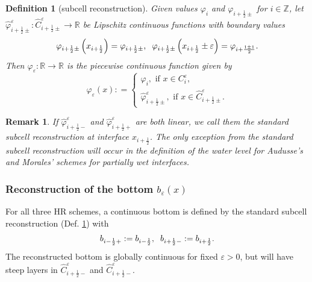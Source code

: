 \documentclass[11pt,a4paper,center,notitlepage]{article}
\numberwithin{equation}{section}
\newtheorem{definition}{Definition}
\newtheorem{remark}{Remark}
\begin{document}
\begin{definition}[subcell reconstruction] 
\label{def1}
Given values $\varphi _i$ and $\varphi _{i+\frac{1}{2}\pm}$ for $i\in \mathbb{Z}$, let $\widehat \varphi _{i + \frac{1}{2} \pm }^\varepsilon :\widehat C_{i + \frac{1}{2} \pm }^\varepsilon  \to \mathbb{R}$ be Lipschitz continuous functions with boundary values
\begin{align}
{\varphi _{i + \frac{1}{2} \pm }}\left( {{x_{i + \frac{1}{2}}}} \right) = {\varphi _{i + \frac{1}{2} \pm }}, \hspace{2mm} {\varphi _{i + \frac{1}{2} \pm }}\left( {{x_{i + \frac{1}{2}}} \pm \varepsilon } \right) = {\varphi _{i + \frac{{1 \pm 1}}{2}}}.
\end{align}
Then $\varphi _\varepsilon: \mathbb{R}\to \mathbb{R}$ is the piecewise continuous function given by 
\begin{equation*}
{\varphi _\varepsilon }\left( x \right): = \left\{ \begin{split}
{\varphi _i}, \mbox{ if } x \in C_i^\varepsilon ,\\
\widehat \varphi _{i + \frac{1}{2} \pm }^\varepsilon , \mbox{ if } x \in \widehat C_{i + \frac{1}{2} \pm }^\varepsilon .
\end{split} \right.
\end{equation*}
\end{definition}

\begin{remark}
If $\widehat \varphi _{i + \frac{1}{2} - }^\varepsilon$ and $\widehat \varphi _{i + \frac{1}{2} + }^\varepsilon$ are both linear, we call them the \emph{standard subcell reconstruction at interface} $x_{i+\frac{1}{2}}$. The only exception from the standard subcell reconstruction will occur in the definition of the water level for Audusse's and Morales' schemes for partially wet interfaces.
\end{remark}

\subsubsection{Reconstruction of the bottom $b_\varepsilon \left(x\right)$}
For all three HR schemes, a continuous bottom is defined by the standard subcell reconstruction (Def. \ref{def1}) with 
\begin{align}
{b_{i - \frac{1}{2} + }}: = {b_{i - \frac{1}{2}}}, \hspace{2mm} {b_{i + \frac{1}{2} - }}: = {b_{i + \frac{1}{2}}} .
\end{align}
The reconstructed bottom is globally continuous for fixed $\varepsilon >0$, but will have steep layers in $\widehat C_{i + \frac{1}{2} - }^\varepsilon $ and $\widehat C_{i + \frac{1}{2} - }^\varepsilon $.
\end{document}
